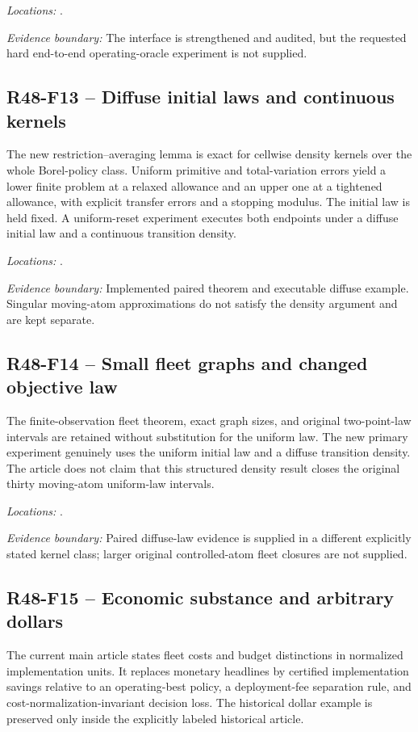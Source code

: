 \noindent\emph{Locations:} .

\noindent\emph{Evidence boundary:} The interface is strengthened and audited, but the requested hard end-to-end operating-oracle experiment is not supplied.

\subsection{R48-F13 -- Diffuse initial laws and continuous kernels}
The new restriction--averaging lemma is exact for cellwise density kernels over the whole Borel-policy class. Uniform primitive and total-variation errors yield a lower finite problem at a relaxed allowance and an upper one at a tightened allowance, with explicit transfer errors and a stopping modulus. The initial law is held fixed. A uniform-reset experiment executes both endpoints under a diffuse initial law and a continuous transition density.

\noindent\emph{Locations:} .

\noindent\emph{Evidence boundary:} Implemented paired theorem and executable diffuse example. Singular moving-atom approximations do not satisfy the density argument and are kept separate.

\subsection{R48-F14 -- Small fleet graphs and changed objective law}
The finite-observation fleet theorem, exact graph sizes, and original two-point-law intervals are retained without substitution for the uniform law. The new primary experiment genuinely uses the uniform initial law and a diffuse transition density. The article does not claim that this structured density result closes the original thirty moving-atom uniform-law intervals.

\noindent\emph{Locations:} .

\noindent\emph{Evidence boundary:} Paired diffuse-law evidence is supplied in a different explicitly stated kernel class; larger original controlled-atom fleet closures are not supplied.

\subsection{R48-F15 -- Economic substance and arbitrary dollars}
The current main article states fleet costs and budget distinctions in normalized implementation units. It replaces monetary headlines by certified implementation savings relative to an operating-best policy, a deployment-fee separation rule, and cost-normalization-invariant decision loss. The historical dollar example is preserved only inside the explicitly labeled historical article.

